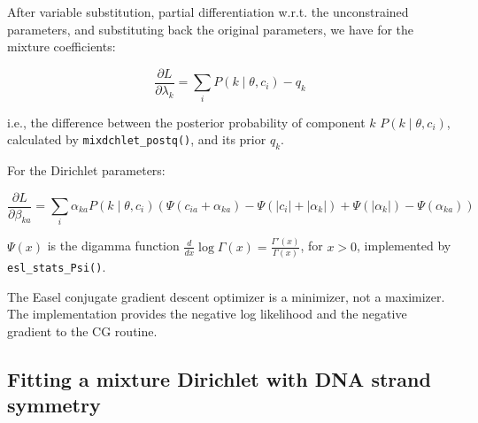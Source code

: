 \documentclass[11pt]{article}
\newcommand{\mono}[1]{{\smaller\texttt{#1}}}                    %
\begin{document}
After variable substitution, partial differentiation w.r.t. the
unconstrained parameters, and substituting back the original
parameters, we have for the mixture coefficients:

\[
  \frac{\partial L}{\partial \lambda_k} = \sum_i P(k \mid \theta, c_i) - q_k
\]

i.e., the difference between the posterior probability of component
$k$ $P(k \mid \theta, c_i)$, calculated by \mono{mixdchlet\_postq()},
and its prior $q_k$.

For the Dirichlet parameters:

\[
\frac{\partial L}{\partial \beta_{ka}}  =  \sum_i
 \alpha_{ka} P(k \mid \theta, c_i) 
    \left( \Psi \left( c_{ia} + \alpha_{ka} \right)  
        -  \Psi \left( | c_i | + | \alpha_k | \right)
        +  \Psi \left( | \alpha_k | \right) 
        -  \Psi \left( \alpha_{ka} \right) 
    \right) 
\]


$\Psi(x)$ is the digamma function $\frac{d}{dx} \log \Gamma(x) =
\frac{\Gamma'(x)}{\Gamma(x)}$, for $x > 0$, implemented by
\mono{esl\_stats\_Psi()}.

The Easel conjugate gradient descent optimizer is a minimizer, not a
maximizer.  The implementation provides the negative log likelihood
and the negative gradient to the CG routine.

\subsection{Fitting a mixture Dirichlet with DNA strand symmetry}
\end{document}
